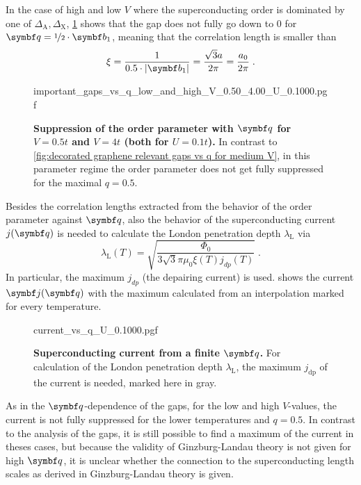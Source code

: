 \documentclass[../notes.tex]{subfiles}
\begin{document}
In the case of high and low \(V\) where the superconducting order is dominated by one of \(\Delta_{\mathrm{A}}, \Delta_{\mathrm{X}}\), \cref{fig:decorated graphene relevant gaps vs q for low and high V} shows that the gap does not fully go down to 0 for \(\vb{q} = \nicefrac{1}{2} \cdot \vb{b}_1\), meaning that the correlation length is smaller than 
\begin{equation}
	\xi = \frac{1}{0.5 \cdot \vert \vb{b}_1 \vert} = \frac{\sqrt{3} a}{2 \pi} = \frac{a_0}{2 \pi}\;.
\end{equation}
\begin{figure}[tb]
	\centering
	{important_gaps_vs_q_low_and_high_V_0.50_4.00_U_0.1000.pgf}
	\caption[Suppression of the order parameter with \(\vb{q}\) for \(V = 0.5t\) and \(V = 4t\) (both for \(U = 0.1t\)).]{
		\textbf{Suppression of the order parameter with \(\vb{q}\) for \(V = 0.5t\) and \(V = 4t\) (both for \(U = 0.1t\)).} In contrast to \cref{fig:decorated graphene relevant gaps vs q for medium V}, in this parameter regime the order parameter does not get fully suppressed for the maximal \(q = 0.5\).}
	\label{fig:decorated graphene relevant gaps vs q for low and high V}
\end{figure}

Besides the correlation lengths extracted from the behavior of the order parameter against \(\vb{q}\), also the behavior of the superconducting current \(j (\vb{q})\) is needed to calculate the London penetration depth \(\lambda_{\mathrm{L}}\) via
\begin{equation}
	\lambda_{\mathrm{L}} (T) = \sqrt{\frac{\Phi_0}{3 \sqrt{3} \pi \mu_0 \xi (T) j_{dp} (T)}}\;.
\end{equation}
In particular, the maximum \(j_{dp}\) (the depairing current) is used.
 shows the current \(\vb{j} (\vb{q})\) with the maximum calculated from an interpolation marked for every temperature.
\begin{figure}[tb]
	\centering
	{current_vs_q_U_0.1000.pgf}
	\caption[Superconducting current from a finite \(\vb{q}\).]{
		\textbf{Superconducting current from a finite \(\vb{q}\).} For calculation of the London penetration depth \(\lambda_{\mathrm{L}}\), the maximum \(j_{\mathrm{dp}}\) of the current is needed, marked here in gray.
	}
	\label{fig:decorated graphene current vs q}
\end{figure}
As in the \(\vb{q}\)-dependence of the gaps, for the low and high \(V\)-values, the current is not fully suppressed for the lower temperatures and \(q = 0.5\).
In contrast to the analysis of the gaps, it is still possible to find a maximum of the current in theses cases, but because the validity of Ginzburg-Landau theory is not given for high \(\vb{q}\), it is unclear whether the connection to the superconducting length scales as derived in Ginzburg-Landau theory is given.
\end{document}
